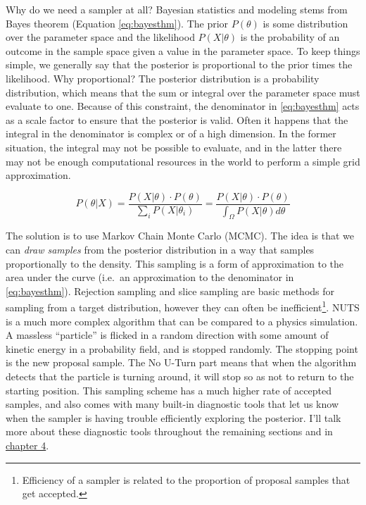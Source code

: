 \documentclass[11pt, oneside, openany]{scrbook}
\begin{document}
Why do we need a sampler at all? Bayesian statistics and modeling stems from Bayes theorem (Equation \eqref{eq:bayesthm}). The prior \(P(\theta)\) is some distribution over the parameter space and the likelihood \(P(X | \theta)\) is the probability of an outcome in the sample space given a value in the parameter space. To keep things simple, we generally say that the posterior is proportional to the prior times the likelihood. Why proportional? The posterior distribution is a probability distribution, which means that the sum or integral over the parameter space must evaluate to one. Because of this constraint, the denominator in \eqref{eq:bayesthm} acts as a scale factor to ensure that the posterior is valid. Often it happens that the integral in the denominator is complex or of a high dimension. In the former situation, the integral may not be possible to evaluate, and in the latter there may not be enough computational resources in the world to perform a simple grid approximation.

\begin{equation}
  P(\theta | X) = \frac{P(X | \theta)\cdot P(\theta)}{\sum_i P(X | \theta_i)} =   \frac{P(X | \theta)\cdot P(\theta)}{\int_\Omega P(X | \theta)d\theta}
  \label{eq:bayesthm}
\end{equation}

The solution is to use Markov Chain Monte Carlo (MCMC). The idea is that we can \emph{draw samples} from the posterior distribution in a way that samples proportionally to the density. This sampling is a form of approximation to the area under the curve (i.e.~an approximation to the denominator in \eqref{eq:bayesthm}). Rejection sampling \citep{gilks1992adaptive} and slice sampling \citep{neal2003slice} are basic methods for sampling from a target distribution, however they can often be inefficient\footnote{Efficiency of a sampler is related to the proportion of proposal samples that get accepted.}. NUTS is a much more complex algorithm that can be compared to a physics simulation. A massless ``particle'' is flicked in a random direction with some amount of kinetic energy in a probability field, and is stopped randomly. The stopping point is the new proposal sample. The No U-Turn part means that when the algorithm detects that the particle is turning around, it will stop so as not to return to the starting position. This sampling scheme has a much higher rate of accepted samples, and also comes with many built-in diagnostic tools that let us know when the sampler is having trouble efficiently exploring the posterior. I'll talk more about these diagnostic tools throughout the remaining sections and in \protect\hyperlink{model-checking}{chapter 4}.
\end{document}
